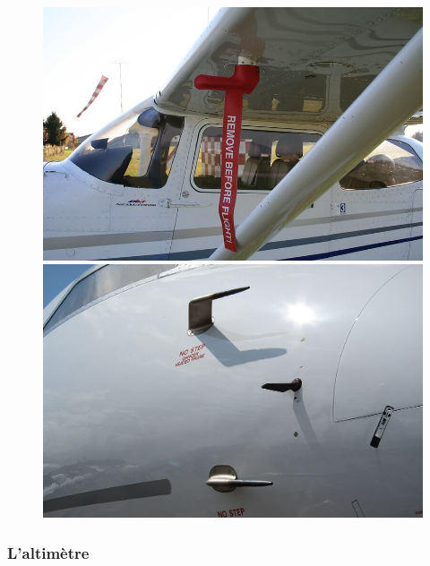 	
	\begin{figure}[H]
	\begin{minipage}[c]{0.5\linewidth}
	\includegraphics[width=\linewidth]{01-EtudeAeronefs/img/tubePitotC172.jpg}
	\end{minipage}
	\hfill
	\begin{minipage}[c]{0.5\linewidth}
	\includegraphics[width=\linewidth]{01-EtudeAeronefs/img/tubesPitotG6000.jpg}
	\end{minipage}
	\end{figure}
	
	\subsubsection{L'altimètre}
	
